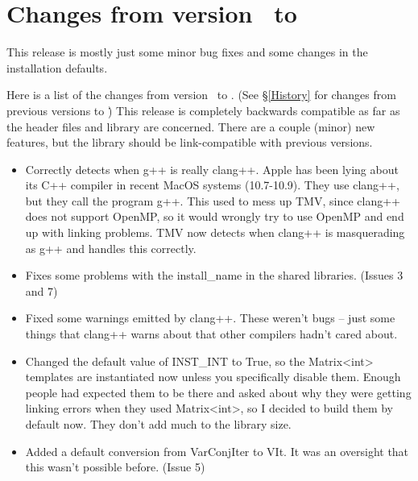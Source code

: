 
\section{Changes from version \prevtmvversion\ to \tmvversion}
\label{Changes}

This release is mostly just some minor bug fixes and some changes in the 
installation defaults.

Here is a list of the changes from version \prevtmvversion\ to \tmvversion.  
(See \S\ref{History} for changes from previous versions to \prevtmvversion\.)
This release is completely backwards compatible as far as the header files and library are 
concerned.  There are a couple (minor) new features, but the library should be link-compatible
with previous versions.

\begin{itemize}

\item
Correctly detects when g++ is really clang++.  Apple has been lying about
its C++ compiler in recent MacOS systems (10.7-10.9).  They use clang++,
but they call the program g++.  This used to mess up TMV, since clang++ 
does not support OpenMP, so it would wrongly try to use OpenMP and end up 
with linking problems.  TMV now detects when clang++ is masquerading as
g++ and handles this correctly.

\item
Fixes some problems with the install\_name in the shared libraries.  
(Issues 3 and 7)

\item
Fixed some warnings emitted by clang++.  These weren't bugs -- just some
things that clang++ warns about that other compilers hadn't cared about.

\item
Changed the default value of INST\_INT to True, so the Matrix<int> templates
are instantiated now unless you specifically disable them.  Enough people
had expected them to be there and asked about why they were getting 
linking errors when they used Matrix<int>, so I decided to build them
by default now.  They don't add much to the library size.

\item
Added a default conversion from VarConjIter to VIt.  It was an oversight
that this wasn't possible before.  (Issue 5)

\end{itemize}
